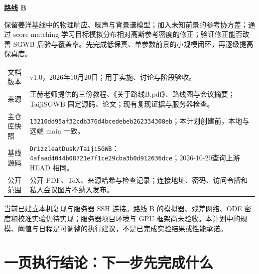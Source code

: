 \documentclass[UTF8,fontset=none,a4paper,11pt]{ctexart}
\newcommand{\code}[1]{\texttt{\nolinkurl{#1}}}
\begin{document}
\begin{titlepage}
\vspace*{10mm}
{\Huge\bfseries\color{navy}路线 B\par}
\vspace{5mm}{\LARGE\bfseries 得分匹配似然修正研究\par 与 A800 服务器实施计划\par}
\vspace{7mm}{\large 基于得分扩散模型的银河混淆前景边缘化\par 与随机引力波背景联合推断\par}
\vspace{8mm}
\begin{keybox}[研究主线]
保留姜洋基线中的物理响应、噪声与背景谱模型；加入未知前景的参考协方差；通过 score matching 学习目标模拟分布相对高斯参考密度的修正；验证修正能否改善 SGWB 后验与覆盖率。先完成低保真、单参数前景的小规模闭环，再逐级提高保真度。
\end{keybox}
\vspace{4mm}
\par\noindent\begin{tabularx}{\linewidth}{p{28mm}Y}
文档版本 & v1.0，2026年10月20日；用于实施、讨论与阶段验收。\\
来源 & 王赫老师提供的三份教程、《关于路线B.pdf》、路线图与会议摘要；TaijiSGWB 固定源码、论文；现有复现证据与服务器检查。\\
主仓库快照 & \code{13210dd95af32cdb376d4bcedebeb262334308eb}；本计划创建前，本地与远端 main 一致。\\
基线源码 & \code{DrizzleatDusk/TaijiSGWB}：\code{4afaad4044b08721e7f1ce29cba3b0d912636dce}；2026-10-20查询上游 HEAD 相同。\\
公开范围 & 公开 PDF、TeX、来源哈希与检查记录；连接地址、密码、访问令牌和私人会议图片不纳入发布。\\
\end{tabularx}\par
\vfill
\begin{keybox}[事实与计划的边界]
当前已建立本机复现与服务器 SSH 连接。路线 B 的模拟器、残差网络、ODE 密度和校准实验仍待实现；服务器项目环境与 GPU 框架尚未验收。本计划中的规模、阈值与日程是可调整的执行建议，不是已完成实验结果或性能承诺。
\end{keybox}
\end{titlepage}
\setcounter{tocdepth}{1}\tableofcontents\clearpage

\section{一页执行结论：下一步先完成什么}
\end{document}

